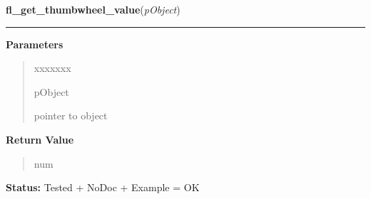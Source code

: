     \label{xformslib:library:fl_get_thumbwheel_value}

    \vspace{0.5ex}

\hspace{.8\funcindent}\begin{boxedminipage}{\funcwidth}

    \raggedright \textbf{fl\_get\_thumbwheel\_value}(\textit{pObject})

    \vspace{-1.5ex}

    \rule{\textwidth}{0.5\fboxrule}
\setlength{\parskip}{2ex}
\setlength{\parskip}{1ex}
      \textbf{Parameters}
      \vspace{-1ex}

      \begin{quote}
        \begin{Ventry}{xxxxxxx}

          \item[pObject]

          pointer to object

        \end{Ventry}

      \end{quote}

      \textbf{Return Value}
    \vspace{-1ex}

      \begin{quote}
      num

      \end{quote}

\textbf{Status:} Tested + NoDoc + Example = OK



    \end{boxedminipage}

    \label{xformslib:library:fl_set_thumbwheel_value}

    \vspace{0.5ex}

